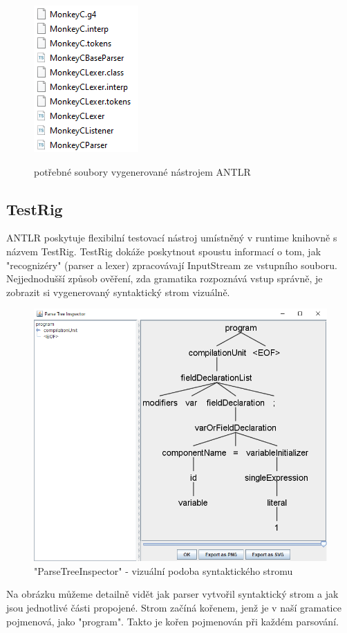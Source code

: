 \begin{figure}
	\centering
	\includegraphics{images/generated_files}
	\\
	\caption{potřebné soubory vygenerované nástrojem ANTLR}
	\label{img:generated_files}
\end{figure}

\subsection{TestRig}
ANTLR poskytuje flexibilní testovací nástroj umístněný v runtime knihovně s názvem TestRig. TestRig dokáže poskytnout spoustu informací o tom, jak "recognizéry" (parser a lexer) zpracovávají InputStream ze vstupního souboru.\\
Nejjednodušší způsob ověření, zda gramatika rozpoznává vstup správně, je zobrazit si vygenerovaný syntaktický strom vizuálně.

\begin{figure}
	\centering
	\includegraphics[scale=0.8]{images/ParseTreeInspector}
	\caption{"ParseTreeInspector" - vizuální podoba syntaktického stromu} 
	\label{img:ParseTreeInspector}
\end{figure}
Na obrázku můžeme detailně vidět jak parser vytvořil syntaktický strom a jak jsou jednotlivé části propojené. Strom začíná kořenem, jenž je v naší gramatice pojmenová, jako "program". Takto je kořen pojmenován při každém parsování. 

\endinput